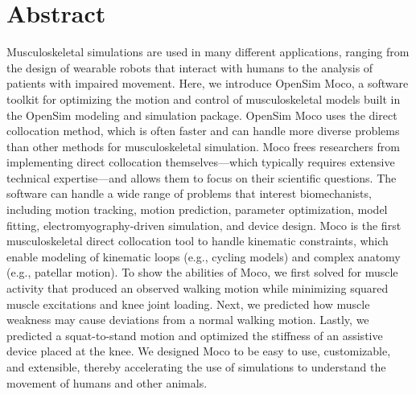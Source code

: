 \documentclass[10pt,letterpaper]{article}
\begin{document}
\section*{Abstract}
Musculoskeletal simulations are used in many different applications, ranging from the design of wearable robots that interact with humans to the analysis of patients with impaired movement. Here, we introduce OpenSim Moco, a software toolkit for optimizing the motion and control of musculoskeletal models built in the OpenSim modeling and simulation package. OpenSim Moco uses the direct collocation method, which is often faster and can handle more diverse problems than other methods for musculoskeletal simulation. Moco frees researchers from implementing direct collocation themselves---which typically requires extensive technical expertise---and allows them to focus on their scientific questions. The software can handle a wide range of problems that interest biomechanists, including motion tracking, motion prediction, parameter optimization, model fitting, electromyography-driven simulation, and device design. Moco is the first musculoskeletal direct collocation tool to handle kinematic constraints, which enable modeling of kinematic loops (e.g., cycling models) and complex anatomy (e.g., patellar motion). To show the abilities of Moco, we first solved for muscle activity that produced an observed walking motion while minimizing squared muscle excitations and knee joint loading. Next, we predicted how muscle weakness may cause deviations from a normal walking motion. Lastly, we predicted a squat-to-stand motion and optimized the stiffness of an assistive device placed at the knee. We designed Moco to be easy to use, customizable, and extensible, thereby accelerating the use of simulations to understand the movement of humans and other animals.


\end{document}
